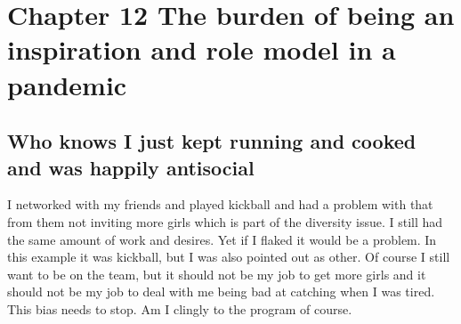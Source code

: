 \chapter{Chapter 12 The burden of being an inspiration and role model in a pandemic}

\section{Who knows I just kept running and cooked and was happily antisocial}
I networked with my friends and played kickball and had a problem with that from them not inviting more girls which is part of the diversity issue. I still had the same amount of work and desires. Yet if I flaked it would be a problem. In this example it was kickball, but I was also pointed out as other. Of course I still want to be on the team, but it should not be my job to get more girls and it should not be my job to deal with me being bad at catching when I was tired. This bias needs to stop. Am I clingly to the program of course. 